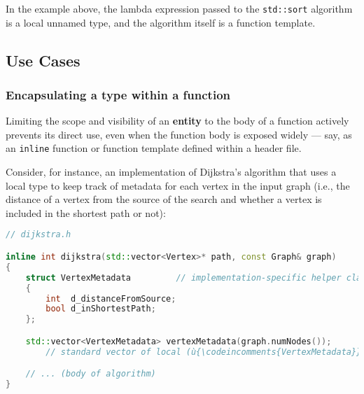 \noindent In the example above, the lambda expression passed to the
\texttt{std::sort} algorithm is a local unnamed type, and the algorithm
itself is a function template.

\subsection[Use Cases]{Use Cases}\label{use-cases}

\subsubsection[Encapsulating a type within a function]{Encapsulating a type within a function}\label{encapsulating-a-type-within-a-function}

Limiting the scope and visibility of an \textbf{entity} to the body of a
function actively prevents its direct use, even when the function body
is exposed widely --- say, as an \texttt{inline} function or function
template defined within a header file.

Consider, for instance, an implementation of Dijkstra's algorithm that
uses a local type to keep track of metadata for each vertex in the input
graph (i.e., the distance of a vertex from the source of the search and
whether a vertex is included in the shortest path or not):

\begin{lstlisting}[language=C++]
// dijkstra.h

inline int dijkstra(std::vector<Vertex>* path, const Graph& graph)
{
    struct VertexMetadata         // implementation-specific helper class
    {
        int  d_distanceFromSource;
        bool d_inShortestPath;
    };

    std::vector<VertexMetadata> vertexMetadata(graph.numNodes());
        // standard vector of local (ù{\codeincomments{VertexMetadata}}ù) objects -- one per vertex

    // ... (body of algorithm)
}
\end{lstlisting}
    
